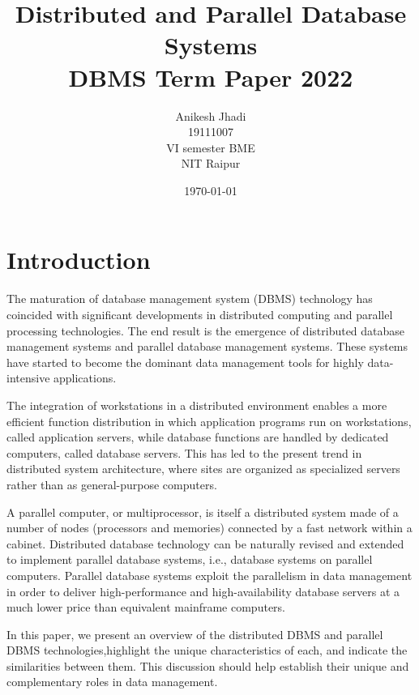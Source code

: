 \documentclass{article}
\title{Distributed and Parallel Database Systems\\DBMS Term Paper 2022}
\author{Anikesh Jhadi \\19111007 \\VI semester BME \\NIT Raipur}
\date{\today}
\begin{document}
\maketitle

\section{Introduction}
The maturation of database management system (DBMS) technology has coincided with significant developments in distributed computing and parallel processing technologies. The end result is the emergence of distributed database management systems and parallel database management systems. These systems have started to become the dominant data management tools for highly data-intensive applications.

The integration of workstations in a distributed environment enables a more efficient function distribution in which application programs run on workstations, called application servers, while database functions are handled by dedicated computers, called database servers. This has led to the present trend in distributed system architecture, where sites are organized as specialized servers rather than as general-purpose
computers.

A parallel computer, or multiprocessor, is itself a distributed system made of a number of nodes (processors and memories) connected by a fast network within a cabinet. Distributed database technology can be naturally revised and extended to implement parallel database systems, i.e., database systems on parallel computers. Parallel database systems exploit the parallelism in data management in order to deliver high-performance and high-availability database servers at a much lower price than equivalent mainframe computers.

In this paper, we present an overview of the distributed DBMS and parallel DBMS technologies,highlight the unique characteristics of each, and indicate the similarities between them. This discussion should help establish their unique and complementary roles in data management.
\end{document}

